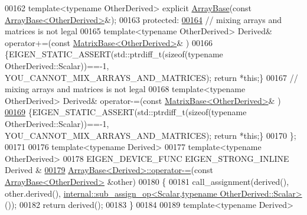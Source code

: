 \begin{DoxyCode}
00162     \textcolor{keyword}{template}<\textcolor{keyword}{typename} OtherDerived> \textcolor{keyword}{explicit} \hyperlink{group___core___module_class_eigen_1_1_array_base}{ArrayBase}(\textcolor{keyword}{const} 
      \hyperlink{group___core___module_class_eigen_1_1_array_base}{ArrayBase<OtherDerived>}&);
00163   \textcolor{keyword}{protected}:
\hyperlink{group___core___module_a09aadb6a71f9293d19c638598a418c92}{00164}     \textcolor{comment}{// mixing arrays and matrices is not legal}
00165     \textcolor{keyword}{template}<\textcolor{keyword}{typename} OtherDerived> Derived& operator+=(\textcolor{keyword}{const} 
      \hyperlink{group___core___module_class_eigen_1_1_matrix_base}{MatrixBase<OtherDerived>}& )
00166     \{EIGEN\_STATIC\_ASSERT(std::ptrdiff\_t(\textcolor{keyword}{sizeof}(\textcolor{keyword}{typename} OtherDerived::Scalar))==-1,
      YOU\_CANNOT\_MIX\_ARRAYS\_AND\_MATRICES); \textcolor{keywordflow}{return} *\textcolor{keyword}{this};\}
00167     \textcolor{comment}{// mixing arrays and matrices is not legal}
00168     \textcolor{keyword}{template}<\textcolor{keyword}{typename} OtherDerived> Derived& operator-=(\textcolor{keyword}{const} 
      \hyperlink{group___core___module_class_eigen_1_1_matrix_base}{MatrixBase<OtherDerived>}& )
\hyperlink{group___core___module_aa978767ac25c6d708d7ac41524f75252}{00169}     \{EIGEN\_STATIC\_ASSERT(std::ptrdiff\_t(\textcolor{keyword}{sizeof}(\textcolor{keyword}{typename} OtherDerived::Scalar))==-1,
      YOU\_CANNOT\_MIX\_ARRAYS\_AND\_MATRICES); \textcolor{keywordflow}{return} *\textcolor{keyword}{this};\}
00170 \};
00171 
00176 \textcolor{keyword}{template}<\textcolor{keyword}{typename} Derived>
00177 \textcolor{keyword}{template}<\textcolor{keyword}{typename} OtherDerived>
00178 EIGEN\_DEVICE\_FUNC EIGEN\_STRONG\_INLINE Derived &
\hyperlink{group___core___module_a6648eeebc4a9d407605410a7149f1a93}{00179} \hyperlink{group___core___module_class_eigen_1_1_array_base}{ArrayBase<Derived>::operator-=}(\textcolor{keyword}{const} 
      \hyperlink{group___core___module_class_eigen_1_1_array_base}{ArrayBase<OtherDerived>} &other)
00180 \{
00181   call\_assignment(derived(), other.derived(), 
      \hyperlink{struct_eigen_1_1internal_1_1sub__assign__op}{internal::sub\_assign\_op<Scalar,typename OtherDerived::Scalar>}
      ());
00182   \textcolor{keywordflow}{return} derived();
00183 \}
00184 
00189 \textcolor{keyword}{template}<\textcolor{keyword}{typename} Derived>

\end{DoxyCode}

